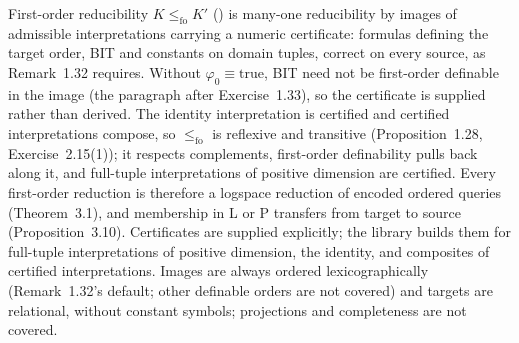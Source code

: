 \begin{result}
First-order reducibility $K\le_{\mathrm{fo}}K'$ () is many-one
reducibility by images of admissible interpretations carrying a numeric
certificate: formulas defining the target order, BIT and constants on domain
tuples, correct on every source, as Remark~1.32 requires. Without
$\varphi_0\equiv\mathrm{true}$, BIT need not be first-order definable in the
image (the paragraph after Exercise~1.33), so the certificate is supplied rather
than derived. The identity interpretation is certified and certified
interpretations compose, so $\le_{\mathrm{fo}}$ is reflexive and transitive
(Proposition~1.28, Exercise~2.15(1)); it respects
complements, first-order definability pulls back along it, and full-tuple
interpretations of positive dimension are certified. Every first-order
reduction is therefore a logspace reduction of encoded ordered queries
(Theorem~3.1), and membership in L or P transfers from target to source
(Proposition~3.10).\citep{Immerman1999}
Certificates are supplied explicitly; the library builds them for full-tuple
interpretations of positive dimension, the identity, and composites of
certified interpretations. Images are always ordered lexicographically
(Remark~1.32's default; other definable orders are not covered) and targets
are relational, without constant symbols; projections and completeness are
not covered.

\end{result}
